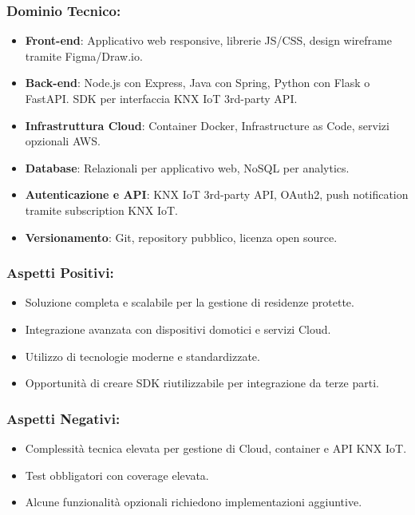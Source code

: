 \documentclass[a4paper,12pt]{article}
\begin{document}
\subsubsection*{Dominio Tecnico:}
\begin{itemize}
    \item \textbf{Front-end}: Applicativo web responsive, librerie JS/CSS, design wireframe tramite Figma/Draw.io.
    \item \textbf{Back-end}: Node.js con Express, Java con Spring, Python con Flask o FastAPI. SDK per interfaccia KNX IoT 3rd-party API.
    \item \textbf{Infrastruttura Cloud}: Container Docker, Infrastructure as Code, servizi opzionali AWS.
    \item \textbf{Database}: Relazionali per applicativo web, NoSQL per analytics.
    \item \textbf{Autenticazione e API}: KNX IoT 3rd-party API, OAuth2, push notification tramite subscription KNX IoT.
    \item \textbf{Versionamento}: Git, repository pubblico, licenza open source.
\end{itemize}

\subsubsection*{Aspetti Positivi:}
\begin{itemize}
    \item Soluzione completa e scalabile per la gestione di residenze protette.
    \item Integrazione avanzata con dispositivi domotici e servizi Cloud.
    \item Utilizzo di tecnologie moderne e standardizzate.
    \item Opportunità di creare SDK riutilizzabile per integrazione da terze parti.
\end{itemize}

\subsubsection*{Aspetti Negativi:}
\begin{itemize}
    \item Complessità tecnica elevata per gestione di Cloud, container e API KNX IoT.
    \item Test obbligatori con coverage elevata.
    \item Alcune funzionalità opzionali richiedono implementazioni aggiuntive.
\end{itemize}
\end{document}
